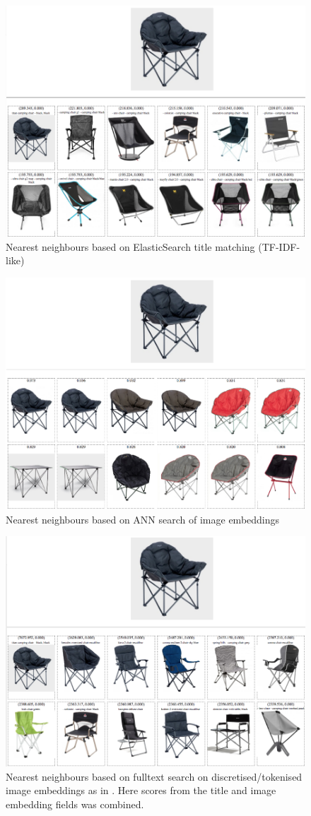 \begin{figure}
  \centering
  \includegraphics[width=0.8\linewidth]{figures/compare/chair_es}
  \caption{Nearest neighbours based on ElasticSearch title matching (TF-IDF-like)}
  \label{chair_es}
\end{figure}
\begin{figure}
  \centering
  \includegraphics[width=0.8\linewidth]{figures/compare/chair_nmslib}
  \caption{Nearest neighbours based on ANN search of image embeddings}
  \label{chair_nmslib}
\end{figure}
\begin{figure}
  \centering
  \includegraphics[width=0.8\linewidth]{figures/compare/chair_tokenised}
  \caption{Nearest neighbours based on fulltext search on discretised/tokenised image embeddings as in \cite{vec_fulltext}. Here scores from the title and image embedding fields was combined.}
  \label{chair_tokenised}
\end{figure}

